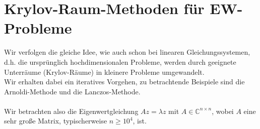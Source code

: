 
\section{Krylov-Raum-Methoden für EW-Probleme}
Wir verfolgen die gleiche Idee, wie auch schon bei linearen Gleichungssystemen, d.h. die ursprünglich hochdimensionalen
Probleme, werden durch geeignete Unterräume (Krylov-Räume) in kleinere Probleme umgewandelt. \\
Wir erhalten dabei ein iteratives Vorgehen, zu betrachtende Beispiele sind die Arnoldi-Methode und die 
Lanczos-Methode.\\ \\
Wir betrachten also die Eigenwertgleichung $Az=\lambda z$ mit $A\in\mathbb{C}^{n\times n}$, wobei $A$ eine sehr große
Matrix, typischerweise $n\geq 10^4$, ist. \\ \\
